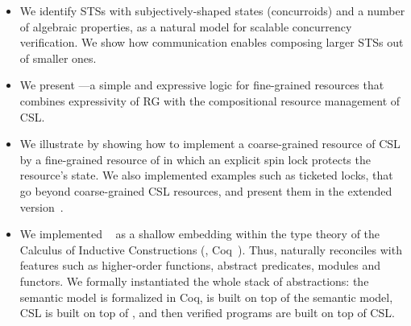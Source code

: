 \begin{itemize}
\item We identify STSs with subjectively-shaped states (concurroids)
  and a number of algebraic properties, as a natural model for
  scalable concurrency verification.  We show how communication
  enables composing larger STSs out of smaller ones.
\item We present \SCST---a simple and expressive logic for
  fine-grained resources that combines expressivity of RG with the
  compositional resource management of CSL.
\item We illustrate \SCST by showing how to implement a coarse-grained
  resource of CSL by a fine-grained resource of \SCST in which an
  explicit spin lock protects the resource's state. We also
  implemented examples such as ticketed locks, that go beyond
  coarse-grained CSL resources, and present them in the extended
  version~\cite{fcsl-coqscripts}.
%
%
\item We implemented \SCST~\cite{fcsl-coqscripts} as a shallow
  embedding within the type theory of the Calculus of Inductive
  Constructions (\ie, Coq~\cite{coq-team,Bertot-Casteran:04}). Thus,
  \SCST naturally reconciles with features such as higher-order
  functions, abstract predicates, modules and functors. We formally
  instantiated the whole stack of abstractions: the semantic model is
  formalized in Coq, \SCST is built on top of the semantic model, CSL
  is built on top of \SCST, and then verified programs are built on
  top of CSL.
\end{itemize}





